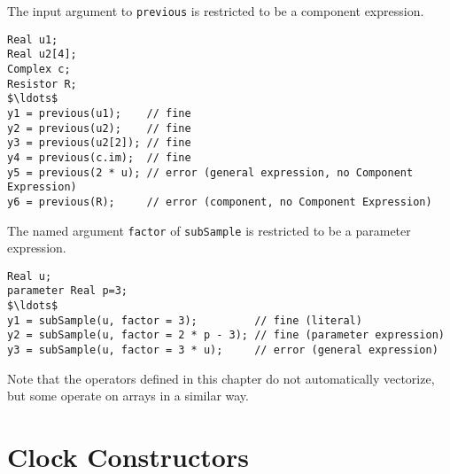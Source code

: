 \begin{example}
The input argument to \lstinline!previous! is restricted to be a component expression.
\begin{lstlisting}[language=modelica]
Real u1;
Real u2[4];
Complex c;
Resistor R;
$\ldots$
y1 = previous(u1);    // fine
y2 = previous(u2);    // fine
y3 = previous(u2[2]); // fine
y4 = previous(c.im);  // fine
y5 = previous(2 * u); // error (general expression, no Component Expression)
y6 = previous(R);     // error (component, no Component Expression)
\end{lstlisting}
\end{example}

\begin{example}
The named argument \lstinline!factor! of \lstinline!subSample! is restricted to be a parameter expression.
\begin{lstlisting}[language=modelica]
Real u;
parameter Real p=3;
$\ldots$
y1 = subSample(u, factor = 3);         // fine (literal)
y2 = subSample(u, factor = 2 * p - 3); // fine (parameter expression)
y3 = subSample(u, factor = 3 * u);     // error (general expression)
\end{lstlisting}
\end{example}

Note that the operators defined in this chapter do not automatically vectorize,
but some operate on arrays in a similar way.

\section{Clock Constructors}\label{clock-constructors}

